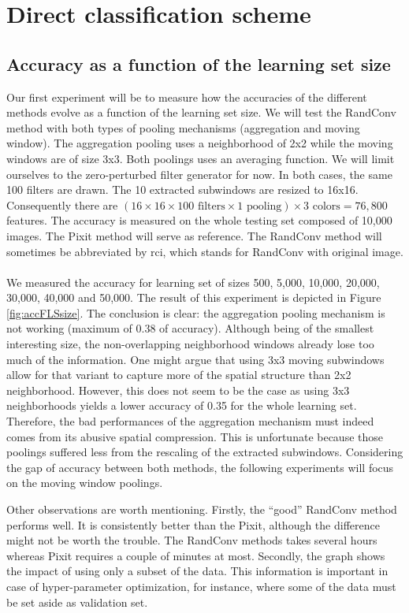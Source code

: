 \documentclass[a4paper]{report}
\begin{document}
	\section{Direct classification scheme}
	
		\subsection{Accuracy as a function of the learning set size}
		Our first experiment will be to measure how the accuracies of the different methods evolve as a function of the learning set size. We will test the RandConv method with both types of pooling mechanisms (aggregation and moving window). The aggregation pooling uses a neighborhood of 2x2 while the moving windows are of size 3x3. Both poolings uses an averaging function. We will limit ourselves to the zero-perturbed filter generator for now. In both cases, the same 100 filters are drawn. The 10 extracted subwindows are resized to 16x16. Consequently there are $(16 \times 16 \times 100 \text{ filters} \times 1 \text{ pooling})\times 3 \text{ colors} = 76,800$ features. The accuracy is measured on the whole testing set composed of 10,000 images. The Pixit method will serve as reference. The RandConv method will sometimes be abbreviated by rci, which stands for RandConv with original image.
		\paragraph{}
		We measured the accuracy for learning set of sizes 500, 5,000, 10,000, 20,000, 30,000, 40,000 and 50,000. The result of this experiment is depicted in Figure \ref{fig:accFLSsize}. The conclusion is clear: the aggregation pooling mechanism is not working (maximum of 0.38 of accuracy). Although being of the smallest interesting size, the non-overlapping neighborhood windows already lose too much of the information. One might argue that using 3x3 moving subwindows allow for that variant to capture more of the spatial structure than 2x2 neighborhood. However, this does not seem to be the case as using 3x3 neighborhoods yields a lower accuracy of 0.35 for the whole learning set. Therefore, the bad performances of the aggregation mechanism must indeed comes from its abusive spatial compression. This is unfortunate because those poolings suffered less from the rescaling of the extracted subwindows. Considering the gap of accuracy between both methods, the following experiments will focus on the moving window poolings.
		\par
		Other observations are worth mentioning. Firstly, the ``good'' RandConv method performs well. It is consistently better than the Pixit, although the difference might not be worth the trouble. The RandConv methods takes several hours whereas Pixit requires a couple of minutes at most. 
		Secondly, the graph shows the impact of using only a subset of the data. This information is important in case of hyper-parameter optimization, for instance, where some of the data must be set aside as validation set.
		
\end{document}
